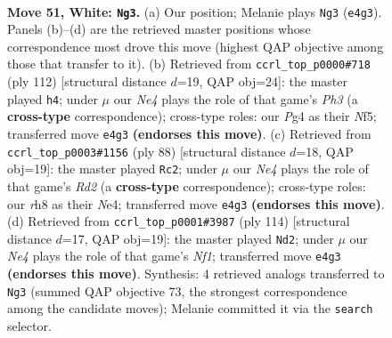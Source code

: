 \documentclass[11pt]{article}
\begin{document}
\clearpage

\begin{figure}[p]\centering
\begin{subfigure}{0.46\textwidth}\centering
\resizebox{\linewidth}{!}{%
\newchessgame
\chessboard[
  setfen={7r/4k3/8/1b2p3/pP2N1P1/R3K3/8/8 w - - 1 51},
  showmover=false,
  pgfstyle=straightmove, color=movearrow, markmove={e4-g3}
]}
\caption{}
\end{subfigure}\hfill
\begin{subfigure}{0.46\textwidth}\centering
\resizebox{\linewidth}{!}{%
\newchessgame
\chessboard[
  setfen={7k/r7/5pR1/4bN1p/8/7P/5PK1/8 w - - 20 57},
  showmover=false,
  pgfstyle=straightmove, color=movearrow, markmove={h3-h4}
]}
\caption{}
\end{subfigure}
\\[4pt]
\begin{subfigure}{0.46\textwidth}\centering
\resizebox{\linewidth}{!}{%
\newchessgame
\chessboard[
  setfen={2b5/1rP1k3/7p/4p3/4N3/5K2/3R3P/8 w - - 2 45},
  showmover=false,
  pgfstyle=straightmove, color=movearrow, markmove={d2-c2}
]}
\caption{}
\end{subfigure}\hfill
\begin{subfigure}{0.46\textwidth}\centering
\resizebox{\linewidth}{!}{%
\newchessgame
\chessboard[
  setfen={8/3b1k2/R7/8/p1P4P/2r5/8/5NK1 w - - 1 58},
  showmover=false,
  pgfstyle=straightmove, color=movearrow, markmove={f1-d2}
]}
\caption{}
\end{subfigure}
\caption{\textbf{Move 51, White: \texttt{Ng3}.} (a) Our position; Melanie plays \texttt{Ng3} (\texttt{e4g3}). Panels (b)--(d) are the retrieved master positions whose correspondence most drove this move (highest QAP objective among those that transfer to it). (b) Retrieved from \texttt{ccrl\_top\_p0000\#718} (ply 112) [structural distance $d$=19, QAP obj=24]: the master played \texttt{h4}; under $\mu$ our \emph{Ne4} plays the role of that game's \emph{Ph3} (a \textbf{cross-type} correspondence); cross-type roles: our \emph{P}g4 as their \emph{N}f5; transferred move \texttt{e4g3} \textbf{(endorses this move)}. (c) Retrieved from \texttt{ccrl\_top\_p0003\#1156} (ply 88) [structural distance $d$=18, QAP obj=19]: the master played \texttt{Rc2}; under $\mu$ our \emph{Ne4} plays the role of that game's \emph{Rd2} (a \textbf{cross-type} correspondence); cross-type roles: our \emph{r}h8 as their \emph{N}e4; transferred move \texttt{e4g3} \textbf{(endorses this move)}. (d) Retrieved from \texttt{ccrl\_top\_p0001\#3987} (ply 114) [structural distance $d$=17, QAP obj=19]: the master played \texttt{Nd2}; under $\mu$ our \emph{Ne4} plays the role of that game's \emph{Nf1}; transferred move \texttt{e4g3} \textbf{(endorses this move)}. Synthesis: 4 retrieved analogs transferred to \texttt{Ng3} (summed QAP objective 73, the strongest correspondence among the candidate moves); Melanie committed it via the \texttt{search} selector.}
\label{fig:thought-m100}
\end{figure}
\end{document}
